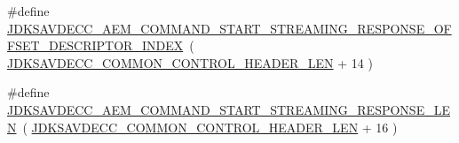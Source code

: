\begin{DoxyCompactItemize}
\item 
\#define \hyperlink{group__command__start__streaming__response_ga65dc087f91917be3348fa5f3eb02556e}{J\+D\+K\+S\+A\+V\+D\+E\+C\+C\+\_\+\+A\+E\+M\+\_\+\+C\+O\+M\+M\+A\+N\+D\+\_\+\+S\+T\+A\+R\+T\+\_\+\+S\+T\+R\+E\+A\+M\+I\+N\+G\+\_\+\+R\+E\+S\+P\+O\+N\+S\+E\+\_\+\+O\+F\+F\+S\+E\+T\+\_\+\+D\+E\+S\+C\+R\+I\+P\+T\+O\+R\+\_\+\+I\+N\+D\+EX}~( \hyperlink{group__jdksavdecc__avtp__common__control__header_gaae84052886fb1bb42f3bc5f85b741dff}{J\+D\+K\+S\+A\+V\+D\+E\+C\+C\+\_\+\+C\+O\+M\+M\+O\+N\+\_\+\+C\+O\+N\+T\+R\+O\+L\+\_\+\+H\+E\+A\+D\+E\+R\+\_\+\+L\+EN} + 14 )
\item 
\#define \hyperlink{group__command__start__streaming__response_gab41f9ca40c12694925ee5017f1584f4e}{J\+D\+K\+S\+A\+V\+D\+E\+C\+C\+\_\+\+A\+E\+M\+\_\+\+C\+O\+M\+M\+A\+N\+D\+\_\+\+S\+T\+A\+R\+T\+\_\+\+S\+T\+R\+E\+A\+M\+I\+N\+G\+\_\+\+R\+E\+S\+P\+O\+N\+S\+E\+\_\+\+L\+EN}~( \hyperlink{group__jdksavdecc__avtp__common__control__header_gaae84052886fb1bb42f3bc5f85b741dff}{J\+D\+K\+S\+A\+V\+D\+E\+C\+C\+\_\+\+C\+O\+M\+M\+O\+N\+\_\+\+C\+O\+N\+T\+R\+O\+L\+\_\+\+H\+E\+A\+D\+E\+R\+\_\+\+L\+EN} + 16 )
\end{DoxyCompactItemize}
